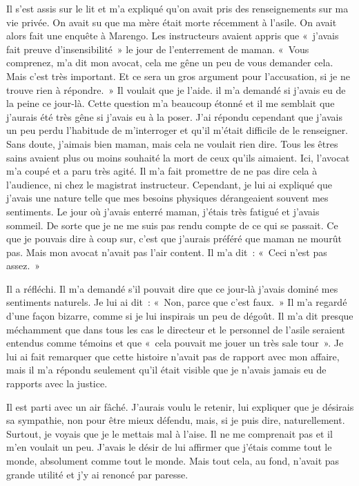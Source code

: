 \documentclass[french,twoside]{book} %
\begin{document}
Il s’est assis sur le lit et m’a expliqué qu’on avait pris des renseignements sur ma vie privée. On avait su que ma mère était morte récemment à l’asile. On avait alors fait une enquête à Marengo. Les instructeurs avaient appris que « j’avais fait preuve d’insensibilité » le jour de l’enterrement de maman. « Vous comprenez, m’a dit mon avocat, cela me gêne un peu de vous demander cela. Mais c’est très important. Et ce sera un gros argument pour l’accusation, si je ne trouve rien à répondre. » Il voulait que je l’aide. il m’a demandé si j’avais eu de la peine ce jour-là. Cette question m’a beaucoup étonné et il me semblait que j’aurais été très gêne si j’avais eu à la poser. J'ai répondu cependant que j’avais un peu perdu l’habitude de m’interroger et qu’il m’était difficile de le renseigner. Sans doute, j’aimais bien maman, mais cela ne voulait rien dire. Tous les êtres sains avaient plus ou moins souhaité la mort de ceux qu’ils aimaient. Ici, l’avocat m’a coupé et a paru très agité. Il m’a fait promettre de ne pas dire cela à l’audience, ni chez le magistrat instructeur. Cependant, je lui ai expliqué que j’avais une nature telle que mes besoins physiques dérangeaient souvent mes sentiments. Le jour où j’avais enterré maman, j’étais très fatigué et j’avais sommeil. De sorte que je ne me suis pas rendu compte de ce qui se passait. Ce que je pouvais dire à coup sur, c’est que j’aurais préféré que maman ne mourût pas. Mais mon avocat n’avait pas l’air content. Il m’a dit : « Ceci n’est pas assez. »\par
Il a réfléchi. Il m’a demandé s’il pouvait dire que ce jour-là j’avais dominé mes sentiments naturels. Je lui ai dit : « Non, parce que c’est faux. » Il m’a regardé d’une façon bizarre, comme si je lui inspirais un peu de dégoût. Il m’a dit presque méchamment que dans tous les cas le directeur et le personnel de l’asile seraient entendus comme témoins et que « cela pouvait me jouer un très sale tour ». Je lui ai fait remarquer que cette histoire n’avait pas de rapport avec mon affaire, mais il m’a répondu seulement qu’il était visible que je n’avais jamais eu de rapports avec la justice.\par
Il est parti avec un air fâché. J'aurais voulu le retenir, lui expliquer que je désirais sa sympathie, non pour être mieux défendu, mais, si je puis dire, naturellement. Surtout, je voyais que je le mettais mal à l’aise. Il ne me comprenait pas et il m’en voulait un peu. J'avais le désir de lui affirmer que j’étais comme tout le monde, absolument comme tout le monde. Mais tout cela, au fond, n’avait pas grande utilité et j’y ai renoncé par paresse.\par
\end{document}
